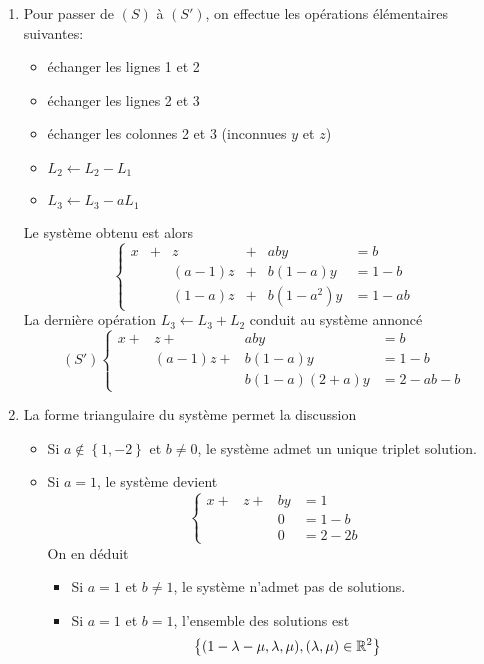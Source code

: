 \begin{enumerate}
  \item Pour passer de $(S)$ à $(S')$, on effectue les opérations élémentaires suivantes:
\begin{itemize}
  \item échanger les lignes 1 et 2
  \item échanger les lignes 2 et 3
  \item échanger les colonnes 2 et 3 (inconnues $y$ et $z$)
  \item $L_2 \leftarrow L_2 -  L_1$
  \item $L_3 \leftarrow L_3 - aL_1$  
\end{itemize}
Le système obtenu est alors
\begin{displaymath}
\left\lbrace  
\begin{alignat}{6}
x &+&     z      &+ &aby       &= b \\
  & &     (a-1)z &+ &b(1-a)y   &= 1-b \\
  & &     (1-a)z &+ &b(1-a^2)y &= 1-ab
\end{alignat}
\right. 
\end{displaymath}
La dernière opération $L_3 \leftarrow L_3 + L_2$ conduit au système annoncé
\begin{displaymath}
(S')
\left\lbrace  
\begin{aligned}
x + &z + &ab y &= b \\
&(a-1)z + &b(1-a)y &= 1-b \\
&  &b(1-a)(2+a)y &= 2-ab -b
\end{aligned}
\right. 
\end{displaymath}

  \item La forme triangulaire du système permet la discussion
\begin{itemize}
  \item Si $a \notin \left\lbrace 1, -2\right\rbrace$ et $b\neq 0$, le système admet un unique triplet solution.
  \item Si $a=1$, le système devient
\begin{displaymath}
\left\lbrace  
\begin{aligned}
x + &z + &b y &= 1 \\
&  & 0 &= 1-b \\
&  & 0 &= 2-2b 
\end{aligned}
\right. 
\end{displaymath}
On en déduit
\begin{itemize}
  \item Si $a=1$ et $b\neq 1$, le système n'admet pas de solutions.
  \item Si $a=1$ et $b=1$, l'ensemble des solutions est
\begin{displaymath}
  \left\lbrace (1-\lambda - \mu, \lambda,  \mu),  (\lambda,\mu) \in \mathbb{R}^2 \right\rbrace 
\end{displaymath}
\end{itemize}


\end{itemize}
\end{enumerate}
